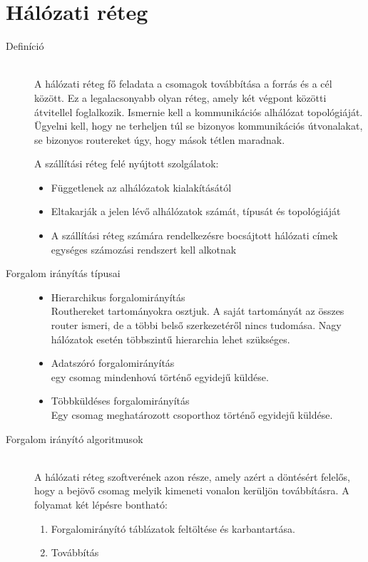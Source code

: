 \documentclass[margin=0px]{article}
\begin{document}
	\section{Hálózati réteg}
		\begin{description}
			\item[Definíció] \hfill \\
				A hálózati réteg fő feladata a csomagok továbbítása a forrás és a cél között. Ez a legalacsonyabb olyan réteg, amely két végpont közötti átvitellel foglalkozik. Ismernie kell a kommunikációs alhálózat topológiáját. Ügyelni kell, hogy ne terheljen túl se bizonyos kommunikációs útvonalakat, se bizonyos routereket úgy, hogy mások tétlen maradnak.
				
				A szállítási réteg felé nyújtott szolgálatok:
				\begin{itemize}
					\item Függetlenek az alhálózatok kialakításától
					\item Eltakarják a jelen lévő alhálózatok számát, típusát és topológiáját
					\item A szállítási réteg számára rendelkezésre bocsájtott hálózati címek egységes számozási rendszert kell alkotnak
				\end{itemize}
			\item[Forgalom irányítás típusai] \hfill
				\begin{itemize}
					\item Hierarchikus forgalomirányítás\\
						Routhereket tartományokra osztjuk. A saját tartományát az összes router ismeri, de a többi belső szerkezetéről nincs tudomása. Nagy hálózatok esetén többszintű hierarchia lehet szükséges. 
					\item Adatszóró forgalomirányítás\\
						egy csomag mindenhová történő egyidejű küldése.
					\item Többküldéses forgalomirányítás\\ 
						Egy csomag meghatározott csoporthoz történő egyidejű küldése.
						
				\end{itemize}

			\item[Forgalom irányító algoritmusok] \hfill \\
				A hálózati réteg szoftverének azon része, amely azért a döntésért felelős, hogy a bejövő csomag melyik kimeneti vonalon kerüljön továbbításra. A folyamat két lépésre bontható:
				\begin{enumerate} 
					\item Forgalomirányító táblázatok feltöltése és karbantartása.
					\item Továbbítás
				\end{enumerate}
				

\end{description}
\end{document}
